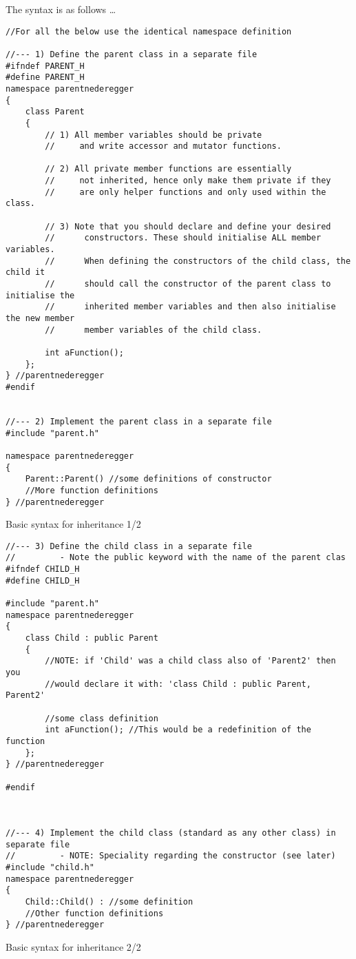 The syntax is as follows \ldots

\begin{listing}[H]
\begin{verbatim}
//For all the below use the identical namespace definition

//--- 1) Define the parent class in a separate file
#ifndef PARENT_H
#define PARENT_H
namespace parentnederegger
{
	class Parent
	{
		// 1) All member variables should be private
		//     and write accessor and mutator functions.
		
		// 2) All private member functions are essentially
		//     not inherited, hence only make them private if they
		//     are only helper functions and only used within the class.
		
		// 3) Note that you should declare and define your desired
		//      constructors. These should initialise ALL member variables.
		//      When defining the constructors of the child class, the child it
		//      should call the constructor of the parent class to initialise the
		//      inherited member variables and then also initialise the new member
		//      member variables of the child class.
		
		int aFunction();
	};
} //parentnederegger
#endif


//--- 2) Implement the parent class in a separate file
#include "parent.h"

namespace parentnederegger
{
	Parent::Parent() //some definitions of constructor
	//More function definitions
} //parentnederegger
\end{verbatim}
\caption{Basic syntax for inheritance 1/2}
\label{source_code_1}
\end{listing}


\begin{listing}[H]
\begin{verbatim}
//--- 3) Define the child class in a separate file
//         - Note the public keyword with the name of the parent clas
#ifndef CHILD_H
#define CHILD_H

#include "parent.h"
namespace parentnederegger
{
	class Child : public Parent
	{
		//NOTE: if 'Child' was a child class also of 'Parent2' then you
		//would declare it with: 'class Child : public Parent, Parent2'
	
		//some class definition
		int aFunction(); //This would be a redefinition of the function
	};
} //parentnederegger

#endif



//--- 4) Implement the child class (standard as any other class) in separate file
//         - NOTE: Speciality regarding the constructor (see later)
#include "child.h"
namespace parentnederegger
{
	Child::Child() : //some definition
	//Other function definitions
} //parentnederegger
\end{verbatim}
\caption{Basic syntax for inheritance 2/2}
\label{source_code_1}
\end{listing}

